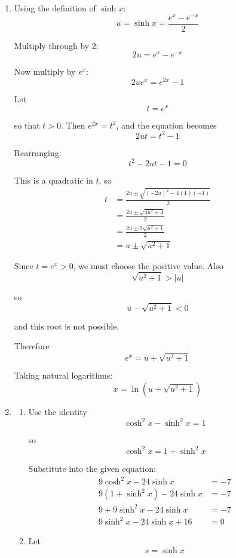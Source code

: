 \documentclass[leqno]{article}
\begin{document}
\begin{enumerate}[
  label=\textbf{\arabic*.},
  leftmargin=*,
  topsep=0pt,
  partopsep=0pt,
  parsep=0pt
]
\begin{djsSolution}
\begin{enumerate}[label=\textbf{(\alph*)}]
  The curve passes through the origin and, since \(\sinh x\) is an odd function, has rotational symmetry about it.

  \item Using the definition of $\sinh x$:
  \[
  u=\sinh x=\frac{e^x-e^{-x}}{2}
  \]

  Multiply through by $2$:
  \[
  2u=e^x-e^{-x}
  \]

  Now multiply by $e^x$:
  \[
  2ue^x=e^{2x}-1
  \]

  Let
  \[
  t=e^x
  \]

  so that $t>0$. Then $e^{2x}=t^2$, and the equation becomes
  \[
  2ut=t^2-1
  \]

  Rearranging:
  \[
  t^2-2ut-1=0
  \]

  This is a quadratic in $t$, so
  \begin{align*}
  t&=\frac{2u\pm\sqrt{(-2u)^2-4(1)(-1)}}{2}\\
  &=\frac{2u\pm\sqrt{4u^2+4}}{2}\\
  &=\frac{2u\pm 2\sqrt{u^2+1}}{2}\\
  &=u\pm\sqrt{u^2+1}
  \end{align*}

  Since $t=e^x>0$, we must choose the positive value. Also
  \[
  \sqrt{u^2+1}>|u|
  \]

  so
  \[
  u-\sqrt{u^2+1}<0
  \]

  and this root is not possible.

  Therefore
  \[
  e^x=u+\sqrt{u^2+1}
  \]

  Taking natural logarithms:
  \[
  x=\ln\left(u+\sqrt{u^2+1}\right)
  \]


  \item
  \begin{enumerate}[label=(\roman*)]
    \item Use the identity
    \[
    \cosh^2 x-\sinh^2 x=1
    \]

    so
    \[
    \cosh^2 x=1+\sinh^2 x
    \]

    Substitute into the given equation:
    \begin{align*}
    9\cosh^2 x-24\sinh x&=-7\\
    9(1+\sinh^2 x)-24\sinh x&=-7\\
    9+9\sinh^2 x-24\sinh x&=-7\\
    9\sinh^2 x-24\sinh x+16&=0
    \end{align*}


    \item Let
    \[
    s=\sinh x
    \]


\end{enumerate}
\end{enumerate}
\end{djsSolution}
\end{enumerate}
\end{document}
